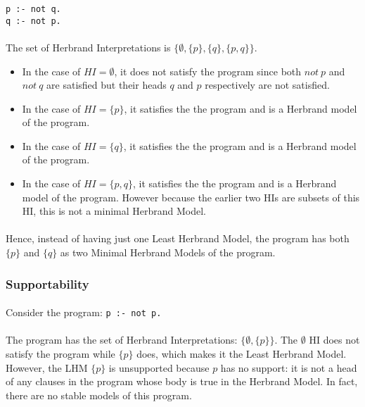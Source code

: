 \documentclass{article}
\theoremstyle{plain}
\theoremstyle{definition}
\begin{document}
\begin{multicols}{2}
\begin{lstlisting}
p :- not q.
q :- not p.
\end{lstlisting}

\paragraph{} The set of Herbrand Interpretations is $\{\emptyset, \{p\}, \{q\}, \{p ,q\}\}$.

\begin{itemize}
\item In the case of $HI = \emptyset$, it does not satisfy the program since both $not\ p$ and $not\ q$ are satisfied but their heads $q$ and $p$ respectively are not satisfied. 
\item In the case of $HI = \{p\}$, it satisfies the the program and is a Herbrand model of the program.
\item In the case of $HI = \{q\}$, it satisfies the the program and is a Herbrand model of the program.
\item In the case of $HI = \{p, q\}$, it satisfies the the program and is a Herbrand model of the program. However because the earlier two HIs are subsets of this HI, this is not a minimal Herbrand Model.
\end{itemize}

\paragraph{} Hence, instead of having just one Least Herbrand Model, the program has both $\{p\}$ and $\{q\}$ as two Minimal Herbrand Models of the program.

\subsubsection{Supportability}

\paragraph{} Consider the program: \lstinline{p :- not p.}

\paragraph{} The program has the set of Herbrand Interpretations: $\{\emptyset, \{p\}\}$. The $\emptyset$ HI does not satisfy the program while $\{p\}$ does, which makes it the Least Herbrand Model. However, the LHM $\{p\}$ is unsupported because $p$ has no support: it is not a head of any clauses in the program whose body is true in the Herbrand Model. In fact, there are no stable models of this program.


\end{multicols}
\end{document}

